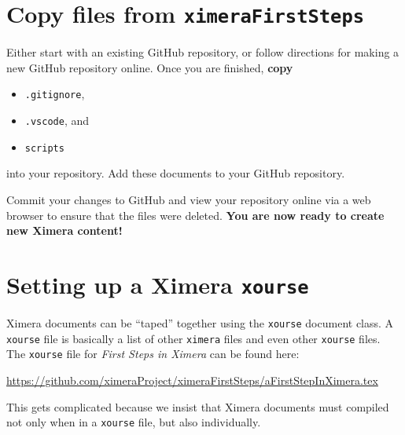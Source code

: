 \documentclass{ximera}
\begin{document}
\section{Copy files from \texttt{ximeraFirstSteps}}

Either start with an existing GitHub repository, or follow directions for
making a new GitHub repository online.
Once you are finished, \textbf{copy}
\begin{itemize}
  \item \verb|.gitignore|,
  \item \verb|.vscode|, and
  \item \verb|scripts|
\end{itemize}
into your repository.
Add these documents to your GitHub repository.

Commit your changes to GitHub and view your
repository online via a web browser to ensure that the files were deleted.
\textbf{You are now ready to create new Ximera content!}

\section{Setting up a Ximera \texttt{xourse}}

Ximera documents can be ``taped'' together using the \verb|xourse| document
class.
A \verb|xourse| file is basically a list of other \verb|ximera| files and even
other \verb|xourse| files.
The \verb|xourse| file for \textit{First Steps in Ximera} can be found here:
\begin{center}

  \url{https://github.com/ximeraProject/ximeraFirstSteps/aFirstStepInXimera.tex}
\end{center}

This gets complicated because we insist that Ximera documents must compiled not
only when in a \verb|xourse| file, but also individually.

\end{document}
